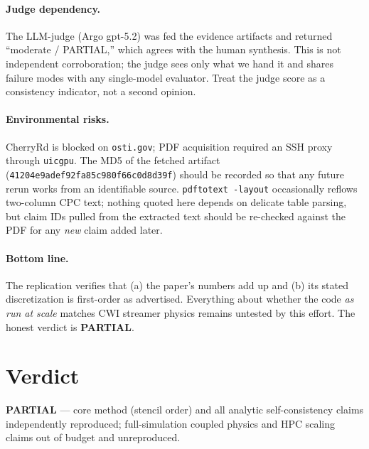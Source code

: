 \documentclass[11pt]{article}
\begin{document}
\paragraph{Judge dependency.}
The LLM-judge (Argo gpt-5.2) was fed the evidence artifacts and returned
``moderate / PARTIAL,'' which agrees with the human synthesis. This is not
independent corroboration; the judge sees only what we hand it and shares
failure modes with any single-model evaluator. Treat the judge score as a
consistency indicator, not a second opinion.

\paragraph{Environmental risks.}
CherryRd is blocked on \texttt{osti.gov}; PDF acquisition required an SSH proxy
through \texttt{uicgpu}. The MD5 of the fetched artifact
(\texttt{41204e9adef92fa85c980f66c0d8d39f}) should be recorded so that any
future rerun works from an identifiable source. \texttt{pdftotext -layout}
occasionally reflows two-column CPC text; nothing quoted here depends on
delicate table parsing, but claim IDs pulled from the extracted text should be
re-checked against the PDF for any \emph{new} claim added later.

\paragraph{Bottom line.}
The replication verifies that (a) the paper's numbers add up and (b) its stated
discretization is first-order as advertised. Everything about whether the code
\emph{as run at scale} matches CWI streamer physics remains untested by this
effort. The honest verdict is \textbf{PARTIAL}.

\section{Verdict}
\textbf{PARTIAL} --- core method (stencil order) and all analytic
self-consistency claims independently reproduced; full-simulation coupled physics
and HPC scaling claims out of budget and unreproduced.
\end{document}
